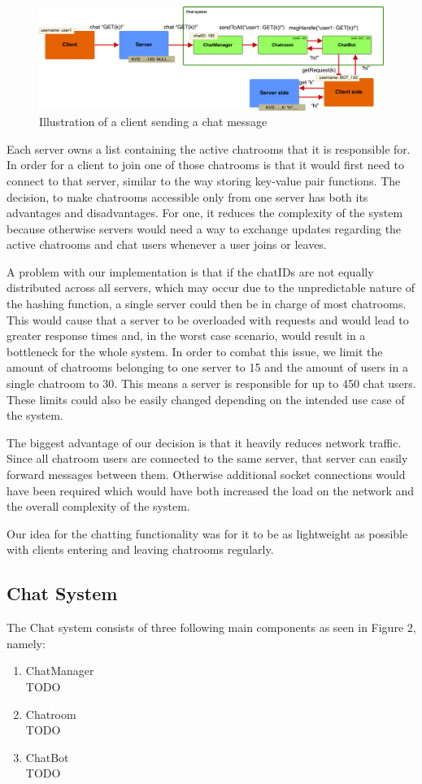 \begin{figure}[h]
	\centering
	\includegraphics[width=\linewidth]{figures/chatsystem.png}
	\caption{Illustration of a client sending a chat message}
	\label{fig:chatsystem}
\end{figure}

Each server owns a list containing the active chatrooms that it is responsible for. In order for a client to join one of those chatrooms is that it would first need to connect to that server, similar to the way storing key-value pair functions. The decision, to make chatrooms accessible only from one server has both its advantages and disadvantages. For one, it reduces the complexity of the system because otherwise servers would need a way to exchange updates regarding the active chatrooms and chat users whenever a user joins or leaves.

A problem with our implementation is that if the chatIDs are not equally distributed across all servers, which may occur due to the unpredictable nature of the hashing function, a single server could then be in charge of most chatrooms. This would cause that a server to be overloaded with requests and would lead to greater response times and, in the worst case scenario, would result in a bottleneck for the whole system. In order to combat this issue, we limit the amount of chatrooms belonging to one server to 15 and the amount of users in a single chatroom to 30. This means a server is responsible for up to 450 chat users. These limits could also be easily changed depending on the intended use case of the system.

The biggest advantage of our decision is that it heavily reduces network traffic. Since all chatroom users are connected to the same server, that server can easily forward messages between them. Otherwise additional socket connections would have been required which would have both increased the load on the network and the overall complexity of the system.

Our idea for the chatting functionality was for it to be as lightweight as possible with clients entering and leaving chatrooms regularly.

\subsection{Chat System}
\label{sec:implementation_chatsystem}
The Chat system consists of three following main components as seen in Figure 2, namely:
\begin{enumerate}
	\item ChatManager\\
	TODO
	\item Chatroom\\
	TODO
	\item ChatBot\\
	TODO
\end{enumerate}